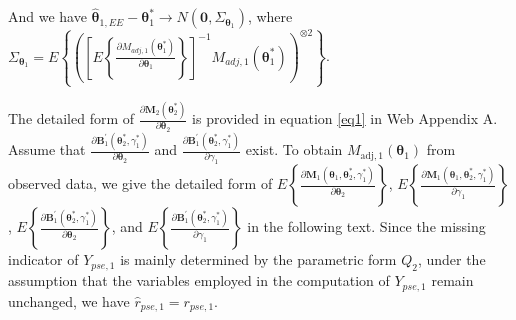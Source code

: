 \documentclass[12pt]{article}
\begin{document}
And we have $\widehat{\bm{\theta}}_{1,EE} - \bm{\theta}_1^* \rightarrow N(\bm{0},\Sigma_{\bm{\theta}_1} )$, where
$\Sigma_{\bm{\theta}_1} = E\left\{\left(\left[E\left\{\frac{\partial M_{adj,1}(\bm{\theta}_1^*)}{\partial \bm{\theta}_1} \right\}\right]^{-1} M_{adj,1}(\bm{\theta}_1^*) \right)^{\otimes 2}\right\} $.


The detailed form of $\frac{\partial \bm{M}_2(\bm{\theta}_2^*)}{\partial \bm{\theta}_2}$ is provided in equation \eqref{eq1} in Web Appendix A. Assume that  $\frac{\partial \bm{B}_1^{\prime}(\bm{\theta}_2^*,\gamma_1^*)}{\partial \bm{\theta}_2}$ and $\frac{\partial \bm{B}_1^{\prime}(\bm{\theta}_2^*,\gamma_1^*)}{\partial \gamma_1}$ exist. To obtain $M_{\mathrm{adj}, 1}(\bm{\theta}_1)$ from observed data, we give the detailed form of $E\left\{\frac{\partial \bm{M}_1(\bm{\theta}_1, \bm{\theta}_2^*,\gamma_1^*)}{\partial \bm{\theta}_2}\right\}$, $E\left\{\frac{\partial \bm{M}_1(\bm{\theta}_1, \bm{\theta}_2^*,\gamma_1^*)}{\partial \gamma_1}\right\}$, $E\left\{\frac{\partial \bm{B}_1^{\prime}(\bm{\theta}_2^*,\gamma_1^*)}{\partial \bm{\theta}_2}\right\}$, and $E\left\{\frac{\partial \bm{B}_1^{\prime}(\bm{\theta}_2^*,\gamma_1^*)}{\partial \gamma_1}\right\}$ in the following text. Since the missing indicator of $Y_{pse,1}$ is mainly determined by the parametric form $Q_{2}$, under the assumption that the variables employed in the computation of $Y_{pse,1}$ remain unchanged, we have $\widehat{r}_{pse,1} = r_{pse,1}$. 
\end{document}
